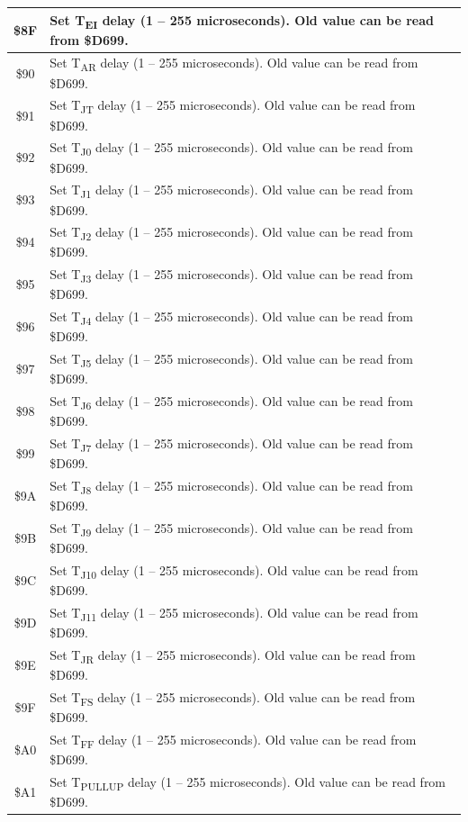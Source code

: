 \begin{center}
\begin{longtable}{|c|L{8cm}|}
        \$8F & Set T\textsubscript{EI} delay (1 -- 255 microseconds). Old value
        can be read from \$D699. \\ \hline        
        \$90 & Set T\textsubscript{AR} delay (1 -- 255 microseconds). Old value
        can be read from \$D699. \\ \hline        
        \$91 & Set T\textsubscript{JT} delay (1 -- 255 microseconds). Old value
        can be read from \$D699. \\ \hline        
        \$92 & Set T\textsubscript{J0} delay (1 -- 255 microseconds). Old value
        can be read from \$D699. \\ \hline        
        \$93 & Set T\textsubscript{J1} delay (1 -- 255 microseconds). Old value
        can be read from \$D699. \\ \hline        
        \$94 & Set T\textsubscript{J2} delay (1 -- 255 microseconds). Old value
        can be read from \$D699. \\ \hline        
        \$95 & Set T\textsubscript{J3} delay (1 -- 255 microseconds). Old value
        can be read from \$D699. \\ \hline        
        \$96 & Set T\textsubscript{J4} delay (1 -- 255 microseconds). Old value
        can be read from \$D699. \\ \hline        
        \$97 & Set T\textsubscript{J5} delay (1 -- 255 microseconds). Old value
        can be read from \$D699. \\ \hline        
        \$98 & Set T\textsubscript{J6} delay (1 -- 255 microseconds). Old value
        can be read from \$D699. \\ \hline        
        \$99 & Set T\textsubscript{J7} delay (1 -- 255 microseconds). Old value
        can be read from \$D699. \\ \hline        
        \$9A & Set T\textsubscript{J8} delay (1 -- 255 microseconds). Old value
        can be read from \$D699. \\ \hline        
        \$9B & Set T\textsubscript{J9} delay (1 -- 255 microseconds). Old value
        can be read from \$D699. \\ \hline        
        \$9C & Set T\textsubscript{J10} delay (1 -- 255 microseconds). Old value
        can be read from \$D699. \\ \hline        
        \$9D & Set T\textsubscript{J11} delay (1 -- 255 microseconds). Old value
        can be read from \$D699. \\ \hline        
        \$9E & Set T\textsubscript{JR} delay (1 -- 255 microseconds). Old value
        can be read from \$D699. \\ \hline        
        \$9F & Set T\textsubscript{FS} delay (1 -- 255 microseconds). Old value
        can be read from \$D699. \\ \hline        
        \$A0 & Set T\textsubscript{FF} delay (1 -- 255 microseconds). Old value
        can be read from \$D699. \\ \hline        
        \$A1 & Set T\textsubscript{PULLUP} delay (1 -- 255 microseconds). Old value
        can be read from \$D699. \\ \hline        
        

\end{longtable}
\end{center}
